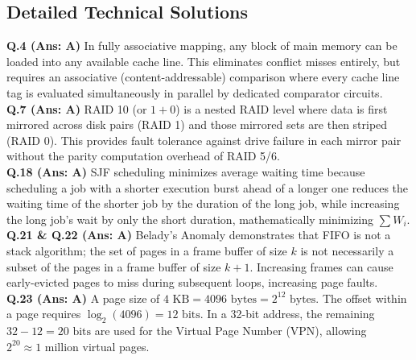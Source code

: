 \vspace{3mm}
\subsection*{Detailed Technical Solutions}

\begin{solutionbox}
\textbf{Q.4 (Ans: A)} In fully associative mapping, any block of main memory can be loaded into any available cache line. This eliminates conflict misses entirely, but requires an associative (content-addressable) comparison where every cache line tag is evaluated simultaneously in parallel by dedicated comparator circuits.\\[2mm]
\textbf{Q.7 (Ans: A)} RAID 10 (or $1+0$) is a nested RAID level where data is first mirrored across disk pairs (RAID 1) and those mirrored sets are then striped (RAID 0). This provides fault tolerance against drive failure in each mirror pair without the parity computation overhead of RAID 5/6.\\[2mm]
\textbf{Q.18 (Ans: A)} SJF scheduling minimizes average waiting time because scheduling a job with a shorter execution burst ahead of a longer one reduces the waiting time of the shorter job by the duration of the long job, while increasing the long job's wait by only the short duration, mathematically minimizing $\sum W_i$.\\[2mm]
\textbf{Q.21 \& Q.22 (Ans: A)} Belady's Anomaly demonstrates that FIFO is not a stack algorithm; the set of pages in a frame buffer of size $k$ is not necessarily a subset of the pages in a frame buffer of size $k+1$. Increasing frames can cause early-evicted pages to miss during subsequent loops, increasing page faults.\\[2mm]
\textbf{Q.23 (Ans: A)} A page size of $4\text{ KB} = 4096\text{ bytes} = 2^{12}\text{ bytes}$. The offset within a page requires $\log_2(4096) = 12\text{ bits}$. In a 32-bit address, the remaining $32 - 12 = 20\text{ bits}$ are used for the Virtual Page Number (VPN), allowing $2^{20} \approx 1\text{ million}$ virtual pages.
\end{solutionbox}

\newpage
